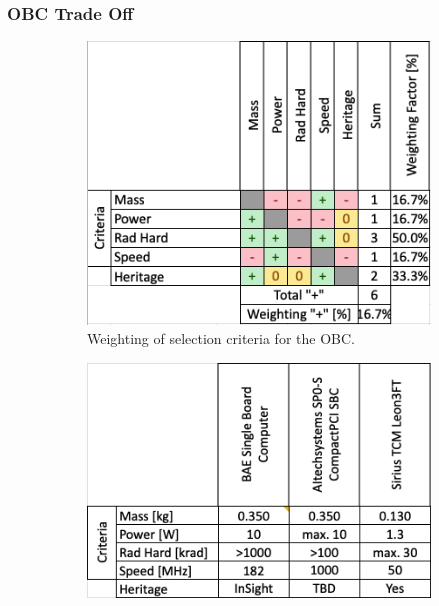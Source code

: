 \subsubsection{OBC Trade Off}
\begin{figure}[h]
     \centering
     \begin{subfigure}[b]{0.49\textwidth}
         \centering
         \includegraphics[width=\textwidth]{Media/Trade_off/OBC/Weighting_OBC.png}
         \caption{Weighting of selection criteria for the OBC.}
         \label{fig:Weighting_Rec}
     \end{subfigure}
     \hfill
     \begin{subfigure}[b]{0.49\textwidth}
         \centering
         \includegraphics[width=\textwidth]{Media/Trade_off/OBC/Values_OBC.png}

\end{subfigure}
\end{figure}
